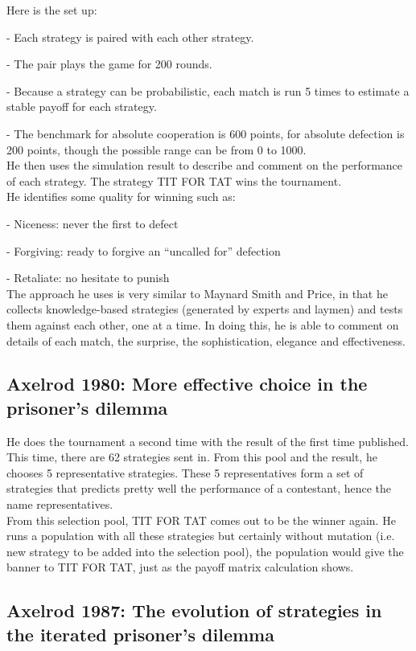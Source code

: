 \documentclass[12.5pt]{report}
\begin{document}
Here is the set up:

- Each strategy is paired with each other strategy. 

- The pair plays the game for 200 rounds.

- Because a strategy can be probabilistic, each match is run 5 times to estimate a stable payoff for each strategy.  

- The benchmark for absolute cooperation is 600 points, for absolute defection is 200 points, though the possible range can be from 0 to 1000.\\

He then uses the simulation result to describe and comment on the performance of each strategy. The strategy TIT FOR TAT wins the tournament. \\

He identifies some quality for winning such as: 

- Niceness: never the first to defect

- Forgiving: ready to forgive an “uncalled for” defection

- Retaliate: no hesitate to punish\\

The approach he uses is very similar to Maynard Smith and Price, in that he collects knowledge-based strategies (generated by experts and laymen) and tests them against each other, one at a time. In doing this, he is able to comment on details of each match, the surprise, the sophistication, elegance and effectiveness.

\subsection{Axelrod 1980: More effective choice in the prisoner’s dilemma}
He does the tournament a second time with the result of the first time published. This time, there are 62 strategies sent in. From this pool and the result, he chooses 5 representative strategies. These 5 representatives form a set of strategies that predicts pretty well the performance of a contestant, hence the name representatives. \\
From this selection pool, TIT FOR TAT comes out to be the winner again. He runs a population with all these strategies but certainly without mutation (i.e. new strategy to be added into the selection pool), the population would give the banner to TIT FOR TAT, just as the payoff matrix calculation shows.

\subsection{Axelrod 1987: The evolution of strategies in the iterated prisoner’s dilemma}
\end{document}
